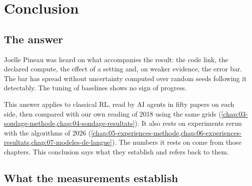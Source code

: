 \chapter{Conclusion}
\label{chap:11-conclusion}

\section{The answer}
\label{sec:reponse}

\begin{keybox}
Joelle Pineau was heard on what accompanies the result: the code link, the declared compute, the
effect of a setting and, on weaker evidence, the error bar. The bar has spread without uncertainty computed over random seeds
following it detectably. The tuning of baselines shows no sign of progress.
\end{keybox}

This answer applies to classical RL, read by AI agents in fifty papers on each side, then compared
with our own reading of 2018 using the same grids
(\cref{chap:03-sondage-methode,chap:04-sondage-resultats}). It also rests on experiments rerun with
the algorithms of 2026
(\cref{chap:05-experiences-methode,chap:06-experiences-resultats,chap:07-modeles-de-langue}). The
numbers it rests on come from those chapters. This conclusion says what they establish and refers
back to them.

\section{What the measurements establish}
\label{sec:nombres}

